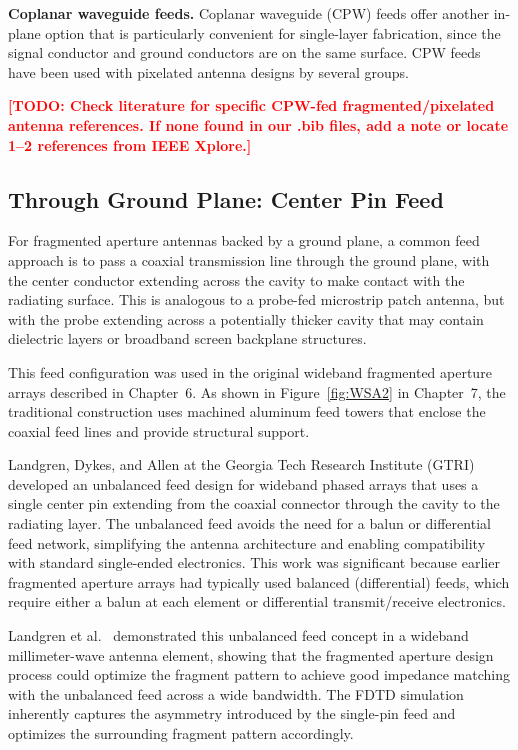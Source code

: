\textbf{Coplanar waveguide feeds.}  Coplanar waveguide (CPW) feeds offer another in-plane option that is particularly convenient for single-layer fabrication, since the signal conductor and ground conductors are on the same surface.  CPW feeds have been used with pixelated antenna designs by several groups.

\textcolor{red}{\textbf{[TODO: Check literature for specific CPW-fed fragmented/pixelated antenna references.  If none found in our .bib files, add a note or locate 1--2 references from IEEE Xplore.]}}

\subsection{Through Ground Plane: Center Pin Feed}
\label{sec:ch4feedCenterPin}

For fragmented aperture antennas backed by a ground plane, a common feed approach is to pass a coaxial transmission line through the ground plane, with the center conductor extending across the cavity to make contact with the radiating surface.  This is analogous to a probe-fed microstrip patch antenna, but with the probe extending across a potentially thicker cavity that may contain dielectric layers or broadband screen backplane structures.

This feed configuration was used in the original wideband fragmented aperture arrays described in Chapter~6.  As shown in Figure~\ref{fig:WSA2} in Chapter~7, the traditional construction uses machined aluminum feed towers that enclose the coaxial feed lines and provide structural support.

Landgren, Dykes, and Allen \cite{Landgren2017Unbalanced} at the Georgia Tech Research Institute (GTRI) developed an unbalanced feed design for wideband phased arrays that uses a single center pin extending from the coaxial connector through the cavity to the radiating layer.  The unbalanced feed avoids the need for a balun or differential feed network, simplifying the antenna architecture and enabling compatibility with standard single-ended electronics.  This work was significant because earlier fragmented aperture arrays had typically used balanced (differential) feeds, which require either a balun at each element or differential transmit/receive electronics.

Landgren et al.\ \cite{Landgren2017Wideband} demonstrated this unbalanced feed concept in a wideband millimeter-wave antenna element, showing that the fragmented aperture design process could optimize the fragment pattern to achieve good impedance matching with the unbalanced feed across a wide bandwidth.  The FDTD simulation inherently captures the asymmetry introduced by the single-pin feed and optimizes the surrounding fragment pattern accordingly.

